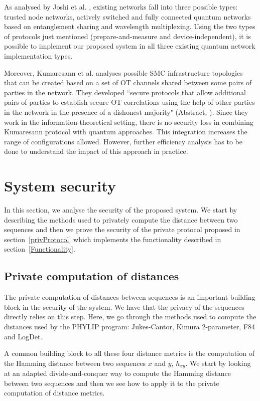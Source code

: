 As analysed by Joshi et al. \cite{JAW20}, existing networks fall into three possible types: trusted node networks, actively switched and fully connected quantum networks based on entanglement sharing and wavelength multiplexing. Using the two types of protocols just mentioned (prepare-and-measure and device-independent), it is possible to implement our proposed system in all three existing quantum network implementation types.

Moreover, Kumaresann et al. \cite{KRS16} analyses possible SMC infrastructure topologies that can be created based on a set of OT channels shared between some pairs of parties in the network. They developed ``secure protocols that allow additional pairs of parties to establish secure OT correlations using the help of other parties in the network in the presence of a dishonest majority" (Abstract, \cite{KRS16}). Since they work in the information-theoretical setting, there is no security loss in combining Kumaresann protocol with quantum approaches. This integration increases the range of configurations allowed. However, further efficiency analysis has to be done to understand the impact of this approach in practice.



\section{System security}\label{systemSecurity}

In this section, we analyse the security of the proposed system. We start by describing the methods used to privately compute the distance between two sequences and then we prove the security of the private protocol proposed in section~\ref{privProtocol} which implements the functionality described in section~\ref{Functionality}.


\subsection{Private computation of distances} \label{privDistances}

The private computation of distances between sequences is an important building block in the security of the system. We have that the privacy of the sequences directly relies on this step. Here, we go through the methods used to compute the distances used by the PHYLIP program: Jukes-Cantor, Kimura 2-parameter, F84 and LogDet.

A common building block to all these four distance metrics is the computation of the Hamming distance between two sequences $x$ and $y$, $h_{xy}$. We start by looking at an adapted divide-and-conquer way to compute the Hamming distance between two sequences and then we see how to apply it to the private computation of distance metrics.

